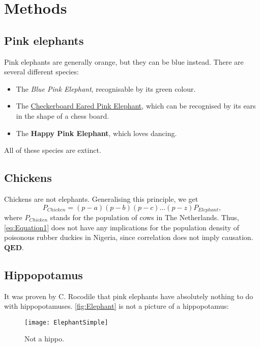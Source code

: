 \section{Methods}\label{sec:Methods}



\subsection{Pink elephants}

Pink elephants are generally orange, but they can be blue instead. There are several different species:
\begin{itemize}
\item The \emph{Blue Pink Elephant}, recognisable by its green colour.
\item The \underline{Checkerboard Eared Pink Elephant}, which can be recognised by its ears in the shape of a chess board.
\item The \textbf{Happy Pink Elephant}, which loves dancing.
\end{itemize}
All of these species are extinct.

\subsection{Chickens}
Chickens are not elephants. Generalising this principle, we get
\begin{equation}
	P_{Chicken} = (p - a)(p - b)(p - c) ... (p - z)P_{Elephant},
	\label{eq:Equation1}
\end{equation}
where $P_{Chicken}$ stands for the population of cows in The Netherlands. Thus, \autoref{eq:Equation1} does not have any implications for the population density of poisonous rubber duckies in Nigeria, since correlation does not imply causation. $\mathbf{QED}$.

\newpage 



\subsection{Hippopotamus}
It was proven by C. Rocodile \cite{Rocodile2014} that pink elephants have absolutely nothing to do with hippopotamuses. \autoref{fig:Elephant} is not a picture of a hippopotamus:
\begin{figure}[h]
	\centering
	\texttt{[image: ElephantSimple]}
	\caption{Not a hippo.}
	\label{fig:Elephant}
\end{figure}

